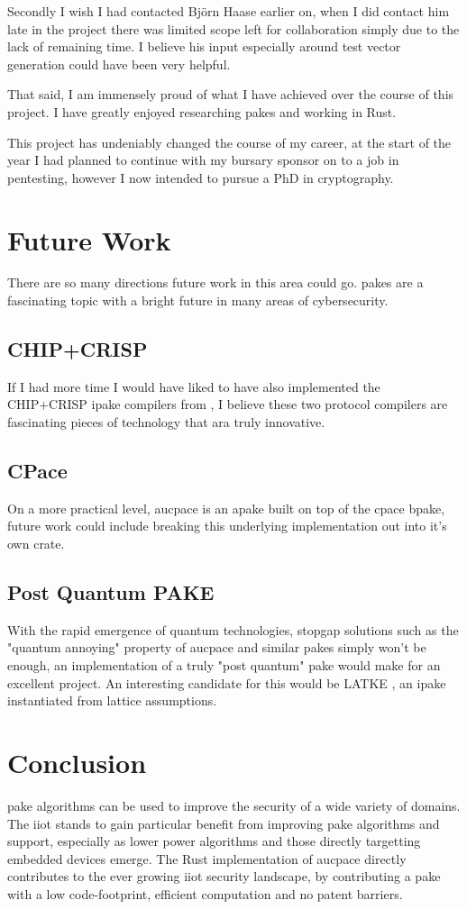 Secondly I wish I had contacted Bj\"orn Haase earlier on, when I did contact him late in the project there was limited scope left for collaboration simply due to the lack of remaining time.
I believe his input especially around test vector generation could have been very helpful.

That said, I am immensely proud of what I have achieved over the course of this project.
I have greatly enjoyed researching \glspl{pake} and working in Rust.

This project has undeniably changed the course of my career, at the start of the year I had planned to continue with my bursary sponsor on to a job in pentesting, however I now intended to pursue a PhD in cryptography.

\section{Future Work}
There are so many directions future work in this area could go.
\glspl{pake} are a fascinating topic with a bright future in many areas of cybersecurity.

\subsection{CHIP+CRISP}
If I had more time I would have liked to have also implemented the CHIP+CRISP \gls{ipake} compilers from \citeauthor{chip+crisp}, I believe these two protocol compilers are fascinating pieces of technology that ara truly innovative.

\subsection{CPace}
On a more practical level, \gls{aucpace} is an \gls{apake} built on top of the \gls{cpace} \gls{bpake}, future work could include breaking this underlying implementation out into it's own crate.

\subsection{Post Quantum PAKE}
With the rapid emergence of quantum technologies, stopgap solutions such as the "quantum annoying" property of \gls{aucpace} and similar \glspl{pake} simply won't be enough, an implementation of a truly "post quantum" \gls{pake} would make for an excellent project.
An interesting candidate for this would be LATKE \cite{latke}, an \gls{ipake} instantiated from lattice assumptions.

\section{Conclusion}
\gls{pake} algorithms can be used to improve the security of a wide variety of domains.
The \gls{iiot} stands to gain particular benefit from improving \gls{pake} algorithms and support, especially as lower power algorithms and those directly targetting embedded devices emerge.
The Rust implementation of \gls{aucpace} directly contributes to the ever growing \gls{iiot} security landscape, by contributing a \gls{pake} with a low code-footprint, efficient computation and no patent barriers.
